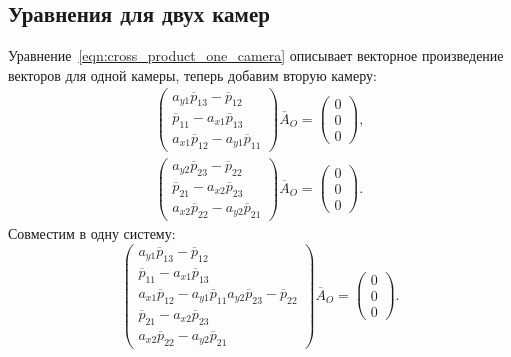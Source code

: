 \documentclass[12pt, a4paper]{article}
\begin{document}
\subsection{Уравнения для двух камер}
\label{sec:two-cameras-eq}
Уравнение~\ref{eqn:cross_product_one_camera} описывает векторное
произведение векторов для одной камеры, теперь добавим вторую камеру:
\begin{equation}
\begin{gathered}
    \begin{pmatrix}
        a_{y1} \overline{p}_{13} - \overline{p}_{12} \\
        \overline{p}_{11} - a_{x1} \overline{p}_{13} \\
        a_{x1} \overline{p}_{12} - a_{y1} \overline{p}_{11}
    \end{pmatrix} \overline{A}_O = \begin{pmatrix}
        0\\
        0\\
        0
    \end{pmatrix}, \\
    \begin{pmatrix}
        a_{y2} \overline{p}_{23} - \overline{p}_{22} \\
        \overline{p}_{21} - a_{x2} \overline{p}_{23} \\
        a_{x2} \overline{p}_{22} - a_{y2} \overline{p}_{21}
    \end{pmatrix} \overline{A}_O = \begin{pmatrix}
        0\\
        0\\
        0
    \end{pmatrix}.
\end{gathered}
\label{eqn:two_cameras_cross_separate}
\end{equation}
Совместим в одну систему:
\begin{equation}
    \begin{pmatrix}
        a_{y1} \overline{p}_{13} - \overline{p}_{12} \\
        \overline{p}_{11} - a_{x1} \overline{p}_{13} \\
        a_{x1} \overline{p}_{12} - a_{y1} \overline{p}_{11}
        a_{y2} \overline{p}_{23} - \overline{p}_{22} \\
        \overline{p}_{21} - a_{x2} \overline{p}_{23} \\
        a_{x2} \overline{p}_{22} - a_{y2} \overline{p}_{21}
    \end{pmatrix} \overline{A}_O = \begin{pmatrix}
        0\\
        0\\
        0
    \end{pmatrix}.
\label{eqn:two_cameras_cross_joined}
\end{equation}
\end{document}
